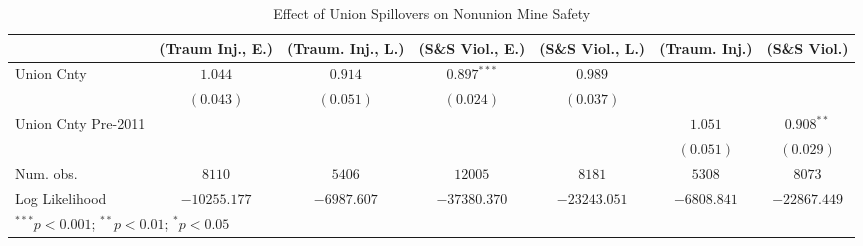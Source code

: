 
\begin{table}[H]
\begin{center}
\begin{tabular}{l c c c c c c}
\hline
 & (Traum Inj., E.) & (Traum. Inj., L.) & (S\&S Viol., E.) & (S\&S Viol., L.) & (Traum. Inj.) & (S\&S Viol.) \\
\hline
Union Cnty          & $1.044$      & $0.914$     & $0.897^{***}$ & $0.989$      &             &              \\
                    & $(0.043)$    & $(0.051)$   & $(0.024)$     & $(0.037)$    &             &              \\
Union Cnty Pre-2011 &              &             &               &              & $1.051$     & $0.908^{**}$ \\
                    &              &             &               &              & $(0.051)$   & $(0.029)$    \\
\hline
Num. obs.           & $8110$       & $5406$      & $12005$       & $8181$       & $5308$      & $8073$       \\
Log Likelihood      & $-10255.177$ & $-6987.607$ & $-37380.370$  & $-23243.051$ & $-6808.841$ & $-22867.449$ \\
\hline
\multicolumn{7}{l}{\scriptsize{$^{***}p<0.001$; $^{**}p<0.01$; $^{*}p<0.05$}}
\end{tabular}
\caption{Effect of Union Spillovers on Nonunion Mine Safety}
\label{irr_100employees_union_extern}
\end{center}
\end{table}

